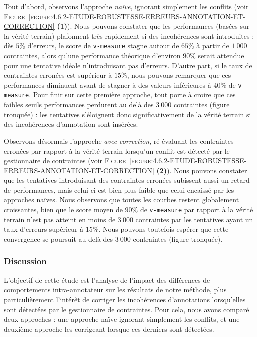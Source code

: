 			Tout d'abord, observons l'approche \textit{naïve}, ignorant simplement les conflits (voir \textsc{Figure~\ref{figure:4.6.2-ETUDE-ROBUSTESSE-ERREURS-ANNOTATION-ET-CORRECTION}} \textbf{(1)}).
			Nous pouvons constater que les performances (basées sur la vérité terrain) plafonnent très rapidement si des incohérences sont introduites : dès $5$\% d'erreurs, le score de \texttt{v-measure} stagne autour de $65$\% à partir de $1~000$ contraintes, alors qu'une performance théorique d'environ $90$\% serait attendue pour une tentative idéale n'introduisant pas d'erreurs.
			D'autre part, si le taux de contraintes erronées est supérieur à $15$\%, nous pouvons remarquer que ces performances diminuent avant de stagner à des valeurs inférieures à $40$\% de \texttt{v-measure}.
			Pour finir sur cette première approche, tout porte à croire que ces faibles seuils performances perdurent au delà des $3~000$ contraintes (figure tronquée) : les tentatives s'éloignent donc significativement de la vérité terrain si des incohérences d'annotation sont insérées.
			
			Observons désormais l'approche \textit{avec correction}, ré-évaluant les contraintes erronées par rapport à la vérité terrain lorsqu'un conflit est détecté par le gestionnaire de contraintes (voir \textsc{Figure~\ref{figure:4.6.2-ETUDE-ROBUSTESSE-ERREURS-ANNOTATION-ET-CORRECTION}} \textbf{(2)}).
			Nous pouvons constater que les tentatives introduisant des contraintes erronées subissent aussi un retard de performances, mais celui-ci est bien plus faible que celui encaissé par les approches naïves.
			Nous observons que toutes les courbes restent globalement croissantes, bien que le score moyen de $90$\% de \texttt{v-measure} par rapport à la vérité terrain n'est pas atteint en moins de $3~000$ contraintes par les tentatives ayant un taux d'erreurs supérieur à $15$\%.
			Nous pouvons toutefois espérer que cette convergence se poursuit au delà des $3~000$ contraintes (figure tronquée).
		
		\subsubsection{Discussion}
		
			L'objectif de cette étude est l'analyse de l'impact des différences de comportements intra-annotateur sur les résultats de notre méthode, plus particulièrement l'intérêt de corriger les incohérences d'annotations lorsqu'elles sont détectées par le gestionnaire de contraintes.
			Pour cela, nous avons comparé deux approches : une approche naïve ignorant simplement les conflits, et une deuxième approche les corrigeant lorsque ces derniers sont détectées.
		

